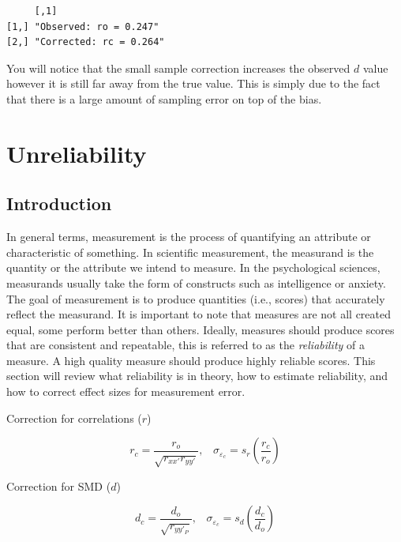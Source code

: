 \documentclass[
  letterpaper,
  DIV=11,
  numbers=noendperiod]{scrreprt}
\begin{document}
\begin{verbatim}
     [,1]                   
[1,] "Observed: ro = 0.247" 
[2,] "Corrected: rc = 0.264"
\end{verbatim}

You will notice that the small sample correction increases the observed
\(d\) value however it is still far away from the true value. This is
simply due to the fact that there is a large amount of sampling error on
top of the bias.

\hypertarget{unreliability}{%
\chapter{Unreliability}\label{unreliability}}

\hypertarget{introduction-1}{%
\section{Introduction}\label{introduction-1}}

In general terms, measurement is the process of quantifying an attribute
or characteristic of something. In scientific measurement, the measurand
is the quantity or the attribute we intend to measure. In the
psychological sciences, measurands usually take the form of constructs
such as intelligence or anxiety. The goal of measurement is to produce
quantities (i.e., scores) that accurately reflect the measurand. It is
important to note that measures are not all created equal, some perform
better than others. Ideally, measures should produce scores that are
consistent and repeatable, this is referred to as the \emph{reliability}
of a measure. A high quality measure should produce highly reliable
scores. This section will review what reliability is in theory, how to
estimate reliability, and how to correct effect sizes for measurement
error.

\begin{tcolorbox}[enhanced jigsaw, arc=.35mm, colback=white, left=2mm, colframe=quarto-callout-note-color-frame, opacitybacktitle=0.6, colbacktitle=quarto-callout-note-color!10!white, coltitle=black, breakable, rightrule=.15mm, leftrule=.75mm, title={\faIcon{bolt} Too long didn't read?}, opacityback=0, bottomtitle=1mm, toptitle=1mm, titlerule=0mm, bottomrule=.15mm, toprule=.15mm]

Correction for correlations (\(r\))

\[r_c = \frac{r_o}{\sqrt{r_{xx'}r_{yy'}}},\;\;\; \sigma_{\varepsilon_c} = s_r \left(\frac{r_c}{r_o}\right)\]

Correction for SMD (\(d\))

\[d_c = \frac{d_o}{\sqrt{r_{yy'_P}}},\;\;\; \sigma_{\varepsilon_c} = s_d \left(\frac{d_c}{d_o}\right)\]

\end{tcolorbox}
\end{document}
